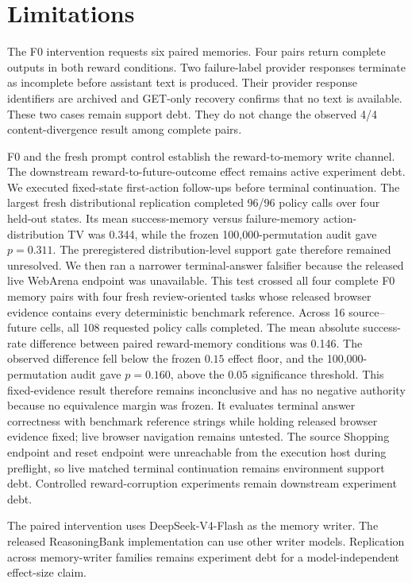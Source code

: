 \section{Limitations}
The F0 intervention requests six paired memories. Four pairs return complete outputs in both reward conditions. Two failure-label provider responses terminate as incomplete before assistant text is produced. Their provider response identifiers are archived and GET-only recovery confirms that no text is available. These two cases remain support debt. They do not change the observed 4/4 content-divergence result among complete pairs.

F0 and the fresh prompt control establish the reward-to-memory write channel. The downstream reward-to-future-outcome effect remains active experiment debt. We executed fixed-state first-action follow-ups before terminal continuation. The largest fresh distributional replication completed 96/96 policy calls over four held-out states. Its mean success-memory versus failure-memory action-distribution TV was 0.344, while the frozen 100,000-permutation audit gave $p=0.311$. The preregistered distribution-level support gate therefore remained unresolved. We then ran a narrower terminal-answer falsifier because the released live WebArena endpoint was unavailable. This test crossed all four complete F0 memory pairs with four fresh review-oriented tasks whose released browser evidence contains every deterministic benchmark reference. Across 16 source--future cells, all 108 requested policy calls completed. The mean absolute success-rate difference between paired reward-memory conditions was 0.146. The observed difference fell below the frozen $0.15$ effect floor, and the 100,000-permutation audit gave $p=0.160$, above the $0.05$ significance threshold. This fixed-evidence result therefore remains inconclusive and has no negative authority because no equivalence margin was frozen. It evaluates terminal answer correctness with benchmark reference strings while holding released browser evidence fixed; live browser navigation remains untested. The source Shopping endpoint and reset endpoint were unreachable from the execution host during preflight, so live matched terminal continuation remains environment support debt. Controlled reward-corruption experiments remain downstream experiment debt.

The paired intervention uses DeepSeek-V4-Flash as the memory writer. The released ReasoningBank implementation can use other writer models. Replication across memory-writer families remains experiment debt for a model-independent effect-size claim.


